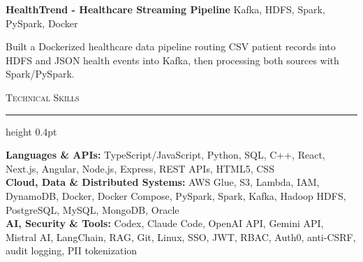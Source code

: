 \documentclass[letterpaper,11pt]{article}
\newcommand{\resumesection}[1]{%
  \par\vspace{2pt}%
  {\large\scshape #1}\par\vspace{2pt}%
  \hrule height 0.4pt\vspace{2pt}%
}
\newcommand{\projectHeading}[2]{
  \textbf{#1} \hfill #2
}
\begin{document}
\projectHeading{HealthTrend - Healthcare Streaming Pipeline}{Kafka, HDFS, Spark, PySpark, Docker}
\begin{tightitemize}
  \item Built a Dockerized healthcare data pipeline routing CSV patient records into HDFS and JSON health events into Kafka, then processing both sources with Spark/PySpark.
\end{tightitemize}

\resumesection{Technical Skills}
\textbf{Languages \& APIs:} TypeScript/JavaScript, Python, SQL, C++, React, Next.js, Angular, Node.js, Express, REST APIs, HTML5, CSS\\
\textbf{Cloud, Data \& Distributed Systems:} AWS Glue, S3, Lambda, IAM, DynamoDB, Docker, Docker Compose, PySpark, Spark, Kafka, Hadoop HDFS, PostgreSQL, MySQL, MongoDB, Oracle\\
\textbf{AI, Security \& Tools:} Codex, Claude Code, OpenAI API, Gemini API, Mistral AI, LangChain, RAG, Git, Linux, SSO, JWT, RBAC, Auth0, anti-CSRF, audit logging, PII tokenization
\end{document}
